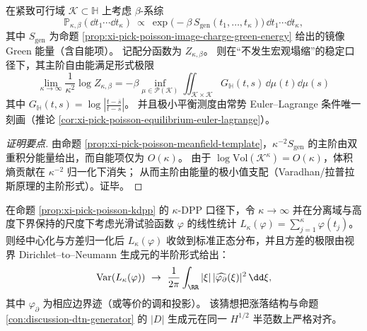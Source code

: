 \begin{proposition}\label{prop:xi-beta-ensemble-leading-free-energy}
在紧致可行域 \(\mathcal K\subset\mathbb H\) 上考虑 \(\beta\)-系综
\[
\mathbb P_{\kappa,\beta}(\dd t_1\cdots \dd t_\kappa)
\ \propto\
\exp\!\bigl(-\beta\,S_{\mathrm{gen}}(t_1,\dots,t_\kappa)\bigr)\,\dd t_1\cdots \dd t_\kappa,
\]
其中 \(S_{\mathrm{gen}}\) 为命题 \ref{prop:xi-pick-poisson-image-charge-green-energy} 给出的镜像 Green 能量（含自能项）。
记配分函数为 \(Z_{\kappa,\beta}\)。
则在“不发生宏观塌缩”的稳定口径下，其主阶自由能满足形式极限
\[
\boxed{\;
\lim_{\kappa\to\infty}\frac{1}{\kappa^2}\log Z_{\kappa,\beta}
=-\beta\inf_{\mu\in\mathcal P(\mathcal K)}
\iint_{\mathcal K\times\mathcal K}G_{\mathbb H}(t,s)\,\dd\mu(t)\dd\mu(s)\;}
\]
其中 \(G_{\mathbb H}(t,s)=\log\left|\frac{t-\overline s}{t-s}\right|\)。
并且极小平衡测度由常势 Euler--Lagrange 条件唯一刻画（推论 \ref{cor:xi-pick-poisson-equilibrium-euler-lagrange}）。
\end{proposition}
\begin{proof}[证明要点]
由命题 \ref{prop:xi-pick-poisson-meanfield-template}，\(\kappa^{-2}S_{\mathrm{gen}}\) 的主阶由双重积分能量给出，而自能项仅为 \(O(\kappa)\)。
由于 \(\log\mathrm{Vol}(\mathcal K^\kappa)=O(\kappa)\)，体积熵贡献在 \(\kappa^{-2}\) 归一化下消失；
从而主阶由能量的极小值支配（Varadhan/拉普拉斯原理的主阶形式）。证毕。
\end{proof}

\begin{conjecture}\label{conj:xi-kdpp-linear-statistics-clt}
在命题 \ref{prop:xi-pick-poisson-kdpp} 的 \(\kappa\)-DPP 口径下，令 \(\kappa\to\infty\) 并在分离域与高度下界保持的尺度下考虑光滑试验函数 \(\varphi\) 的线性统计
\(
L_\kappa(\varphi)=\sum_{j=1}^{\kappa}\varphi(t_j)
\)。
则经中心化与方差归一化后 \(L_\kappa(\varphi)\) 收敛到标准正态分布，并且方差的极限由视界 Dirichlet--to--Neumann 生成元的半阶形式给出：
\[
\mathrm{Var}(L_\kappa(\varphi))
\ \to\
\frac{1}{2\pi}\int_{\RR}|\xi|\,|\widehat{\varphi_{\partial}}(\xi)|^2\,\dd\xi,
\]
其中 \(\varphi_{\partial}\) 为相应边界迹（或等价的调和投影）。
该猜想把涨落结构与命题 \ref{con:discussion-dtn-generator} 的 \(|D|\) 生成元在同一 \(H^{1/2}\) 半范数上严格对齐。
\end{conjecture}

